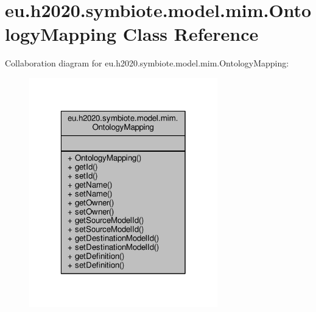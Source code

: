 \hypertarget{classeu_1_1h2020_1_1symbiote_1_1model_1_1mim_1_1OntologyMapping}{}\section{eu.\+h2020.\+symbiote.\+model.\+mim.\+Ontology\+Mapping Class Reference}
\label{classeu_1_1h2020_1_1symbiote_1_1model_1_1mim_1_1OntologyMapping}


Collaboration diagram for eu.\+h2020.\+symbiote.\+model.\+mim.\+Ontology\+Mapping\+:
\nopagebreak
\begin{figure}[H]
\begin{center}
\leavevmode
\includegraphics[width=232pt]{classeu_1_1h2020_1_1symbiote_1_1model_1_1mim_1_1OntologyMapping__coll__graph}
\end{center}
\end{figure}
